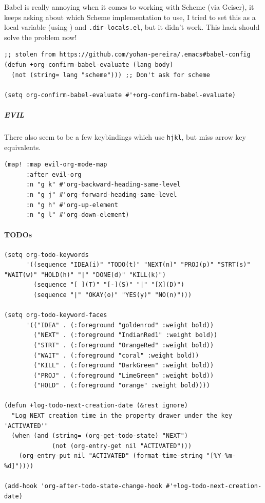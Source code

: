 \documentclass[11pt]{article}
\begin{document}
Babel is really annoying when it comes to working with Scheme (via Geiser), it
keeps asking about which Scheme implementation to use, I tried to set this as a
local variable (using )
and \texttt{.dir-locals.el}, but it didn't work. This hack should solve the problem now!

\begin{verbatim}
;; stolen from https://github.com/yohan-pereira/.emacs#babel-config
(defun +org-confirm-babel-evaluate (lang body)
  (not (string= lang "scheme"))) ;; Don't ask for scheme

(setq org-confirm-babel-evaluate #'+org-confirm-babel-evaluate)
\end{verbatim}

\subparagraph{EVIL}
\label{sec:orge6f75e7}
There also seem to be a few keybindings which use \texttt{hjkl}, but miss arrow key
equivalents.

\begin{verbatim}
(map! :map evil-org-mode-map
      :after evil-org
      :n "g k" #'org-backward-heading-same-level
      :n "g j" #'org-forward-heading-same-level
      :n "g h" #'org-up-element
      :n "g l" #'org-down-element)
\end{verbatim}

\paragraph{TODOs}
\label{sec:org37ae624}

\begin{verbatim}
(setq org-todo-keywords
      '((sequence "IDEA(i)" "TODO(t)" "NEXT(n)" "PROJ(p)" "STRT(s)" "WAIT(w)" "HOLD(h)" "|" "DONE(d)" "KILL(k)")
        (sequence "[ ](T)" "[-](S)" "|" "[X](D)")
        (sequence "|" "OKAY(o)" "YES(y)" "NO(n)")))

(setq org-todo-keyword-faces
      '(("IDEA" . (:foreground "goldenrod" :weight bold))
        ("NEXT" . (:foreground "IndianRed1" :weight bold))
        ("STRT" . (:foreground "OrangeRed" :weight bold))
        ("WAIT" . (:foreground "coral" :weight bold))
        ("KILL" . (:foreground "DarkGreen" :weight bold))
        ("PROJ" . (:foreground "LimeGreen" :weight bold))
        ("HOLD" . (:foreground "orange" :weight bold))))

(defun +log-todo-next-creation-date (&rest ignore)
  "Log NEXT creation time in the property drawer under the key 'ACTIVATED'"
  (when (and (string= (org-get-todo-state) "NEXT")
             (not (org-entry-get nil "ACTIVATED")))
    (org-entry-put nil "ACTIVATED" (format-time-string "[%Y-%m-%d]"))))

(add-hook 'org-after-todo-state-change-hook #'+log-todo-next-creation-date)
\end{verbatim}
\end{document}

